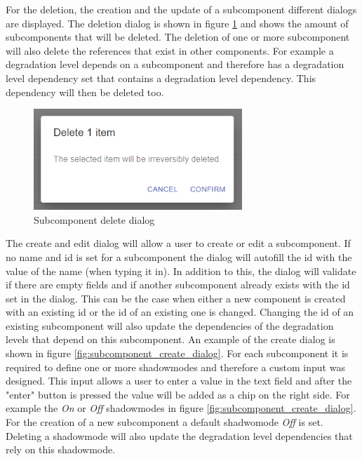 For the deletion, the creation and the update of a subcomponent different dialogs are displayed. The deletion dialog is shown in figure \ref{fig:subcomponent_delete_dialog} and shows the amount of subcomponents that will be deleted. The deletion of one or more subcomponent will also delete the references that exist in other components. For example a degradation level depends on a subcomponent and therefore has a degradation level dependency set that contains a degradation level dependency. This dependency will then be deleted too.

\begin{figure}[ht]
    \centering
    \includegraphics[width=0.7\textwidth]{img/subcomponents_delete.png}
    \caption{Subcomponent delete dialog}
    \label{fig:subcomponent_delete_dialog}
\end{figure}

The create and edit dialog will allow a user to create or edit a subcomponent. If no name and id is set for a subcomponent the dialog will autofill the id with the value of the name (when typing it in). In addition to this, the dialog will validate if there are empty fields and if another subcomponent already exists with the id set in the dialog. This can be the case when either a new component is created with an existing id or the id of an existing one is changed. Changing the id of an existing subcomponent will also update the dependencies of the degradation levels that depend on this subcomponent. An example of the create dialog is shown in figure \ref{fig:subcomponent_create_dialog}. For each subcomponent it is required to define one or more shadowmodes and therefore a custom input was designed. This input allows a user to enter a value in the text field and after the "enter" button is pressed the value will be added as a chip on the right side. For example the \textit{On} or \textit{Off} shadowmodes in figure \ref{fig:subcomponent_create_dialog}. For the creation of a new subcomponent a default shadwomode \textit{Off} is set. Deleting a shadowmode will also update the degradation level dependencies that rely on this shadowmode.

